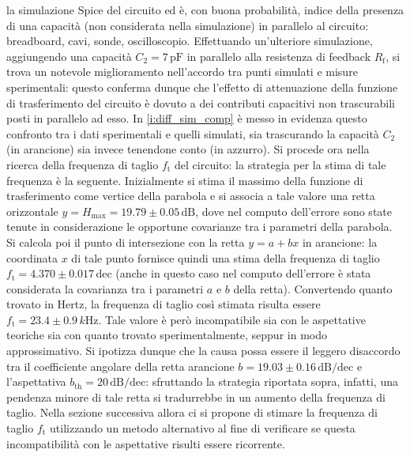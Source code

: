\documentclass[a4paper,11pt]{article} %
\begin{document}
\noindent la simulazione Spice del circuito ed è, con buona probabilità, indice della presenza di una capacità (non
considerata nella simulazione) in parallelo al circuito: breadboard, cavi, sonde, oscilloscopio. Effettuando
un'ulteriore simulazione, aggiungendo una capacità $C_{2}=7\,\si{\pF}$ in parallelo alla resistenza di feedback
$R_{\text{f}}$, si trova un notevole miglioramento nell'accordo tra punti simulati e misure sperimentali: questo
conferma dunque che l'effetto di attenuazione della funzione di trasferimento del circuito è dovuto a dei contributi
capacitivi non trascurabili posti in parallelo ad esso. In \autoref{i:diff_sim_comp} è messo in evidenza questo
confronto tra i dati sperimentali e quelli simulati, sia trascurando la capacità $C_{2}$ (in arancione) sia invece
tenendone conto (in azzurro). Si procede ora nella ricerca della frequenza di taglio $f_{\text{t}}$ del circuito: la
strategia per la stima di tale frequenza è la seguente. Inizialmente si stima il massimo della funzione di
trasferimento come vertice della parabola e si associa a tale valore una retta orizzontale
$y=H_{\text{max}}=19.79\pm 0.05\,\text{dB}$, dove nel computo dell'errore sono state tenute in considerazione le
opportune covarianze tra i parametri della parabola. Si calcola poi il punto di intersezione con la retta  $y=a+bx$
in arancione: la coordinata $x$ di tale punto fornisce quindi una stima della frequenza di taglio
$f_{\text{t}}=4.370 \pm 0.017\,\text{dec}$ (anche in questo caso nel computo dell'errore è stata considerata la
covarianza tra i parametri $a$ e $b$ della retta). Convertendo quanto trovato in Hertz, la frequenza di taglio così
stimata risulta essere $f_{\text{t}}=23.4 \pm 0.9\,\si{k\Hz}$. Tale valore è però incompatibile sia con le
aspettative teoriche sia con quanto trovato sperimentalmente, seppur in modo approssimativo. Si ipotizza dunque che
la causa possa essere il leggero disaccordo tra il coefficiente angolare della retta arancione $b = 19.03\pm
0.16\,\text{dB/dec}$ e l'aspettativa $b_{\text{th}}=20\,\text{dB/dec}$: sfruttando la strategia riportata sopra,
infatti, una pendenza minore di tale retta si tradurrebbe in un aumento della frequenza di taglio. Nella sezione
successiva allora ci si propone di stimare la frequenza di taglio $f_{\text{t}}$ utilizzando un metodo alternativo
al fine di verificare se questa incompatibilità con le aspettative risulti essere ricorrente.


\end{document}
